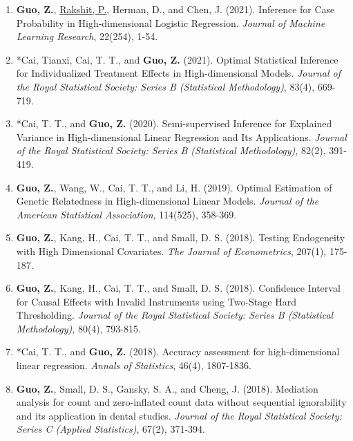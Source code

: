 \documentclass[margin, line]{res}
\begin{document}
\begin{resume}
\begin{enumerate}
			\item {\bf Guo, Z.}, \underline{Rakshit, P.}, Herman, D., and Chen, J. (2021).
				Inference for Case Probability in High-dimensional Logistic Regression. {\it Journal of Machine Learning Research},
				22(254), 1-54. %

			\item {*}Cai, Tianxi, Cai, T. T., and {\bf Guo, Z.} (2021). Optimal Statistical
				Inference for Individualized Treatment Effects in High-dimensional Models.
				{\it Journal of the Royal Statistical Society: Series B (Statistical Methodology)},
				83(4), 669-719. %

			\item {*}Cai, T. T., and {\bf Guo, Z.} (2020). Semi-supervised Inference for
				Explained Variance in High-dimensional Linear Regression and Its Applications.
				{\it Journal of the Royal Statistical Society: Series B (Statistical Methodology)},
				82(2), 391-419. %

			\item {\bf Guo, Z.}, Wang, W., Cai, T. T., and Li, H. (2019). Optimal
				Estimation of Genetic Relatedness in High-dimensional Linear Models. {\it Journal of the American Statistical Association},
				114(525), 358-369. %

			\item {\bf Guo, Z.}, Kang, H., Cai, T. T., and Small, D. S. (2018). Testing
				Endogeneity with High Dimensional Covariates.
				{\it The Journal of Econometrics}, 207(1), 175-187. %

			\item {\bf Guo, Z.}, Kang, H., Cai, T. T., and Small, D. S. (2018). Confidence
				Interval for Causal Effects with Invalid Instruments using Two-Stage Hard
				Thresholding.
				{\it Journal of the Royal Statistical Society: Series B (Statistical Methodology)},
				80(4), 793-815. %

			\item {*}Cai, T. T., and {\bf Guo, Z.} (2018). Accuracy assessment for high-dimensional
				linear regression. {\it Annals of Statistics}, 46(4), 1807-1836. %

			\item {\bf Guo, Z.}, Small, D. S., Gansky, S. A., and Cheng, J. (2018). Mediation
				analysis for count and zero-inflated count data without sequential ignorability
				and its application in dental studies.
				{\it Journal of the Royal Statistical Society: Series C (Applied Statistics)},
				67(2), 371-394.


\end{enumerate}
\end{resume}
\end{document}
